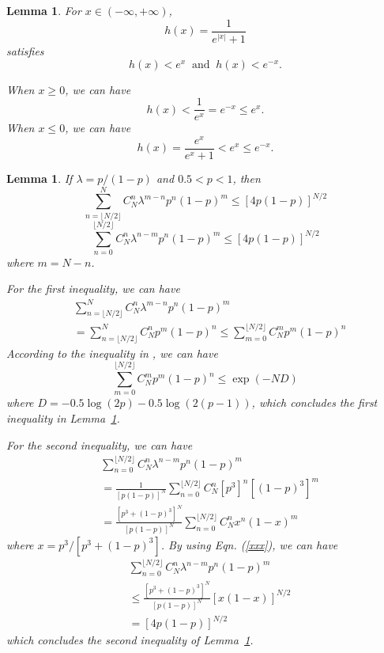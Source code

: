 \documentclass{article}
\makeatletter
\newcounter{lemmas}
\newtheorem{lemma}[lemmas]{Lemma}
\renewenvironment{proof}[1][\proofname]{\par
  \vspace{-\topsep}%
  \pushQED{\qed}%
  \normalfont
  \topsep0pt \partopsep0pt %
  \trivlist
  \item[\hskip\labelsep
        \itshape
    #1\@addpunct{.}]\ignorespaces
}{%
  \popQED\endtrivlist\@endpefalse
  \addvspace{0pt plus 0pt} %
}
\makeatother
\begin{document}
\begin{lemma}
\label{Concave2}
For $x\in(-\infty, +\infty)$, 
$$h(x)=\frac{1}{e^{|x|}+1}$$
satisfies
$$h(x)< e^x \;\;\mathrm{and}\;\; h(x)< e^{-x}.$$
\begin{proof}
When $x\geq 0$, we can have
\begin{equation}
h(x)<\frac{1}{e^x}=e^{-x}\leq e^{x}.
\end{equation}
When $x\leq 0$, we can have
\begin{equation}
h(x)=\frac{e^x}{e^x+1}<e^{x}\leq e^{-x}.
\end{equation}
\end{proof}
\end{lemma}

\begin{lemma}
\label{Concave3}
If $\lambda=p/(1-p)$ and $0.5<p<1$, then
$${\sum}_{n=\lfloor N/2 \rfloor}^{N}C_N^n\lambda^{m-n}p^n(1-p)^m\leq [4p(1-p)]^{N/2}$$
$${\sum}_{n=0}^{\lfloor N/2 \rfloor}C_N^n\lambda^{n-m}p^n(1-p)^m\leq [4p(1-p)]^{N/2}$$
where $m=N-n$.
\begin{proof}
For the first inequality, we can have
\begin{align}
&\sum_{n=\lfloor N/2 \rfloor}^{N}C_N^n\lambda^{m-n}p^n(1-p)^m \\&=\sum_{n=\lfloor N/2 \rfloor}^{N}C_N^np^m(1-p)^n\leq \sum_{m=0}^{\lfloor N/2 \rfloor}C_N^m p^m(1-p)^n\nonumber
\end{align}
According to the inequality in \cite{Arratia1989}, we can have
\begin{equation}
\label{xxx}
 \sum_{m=0}^{\lfloor N/2 \rfloor}C_N^m p^m(1-p)^n \leq \exp (-ND)
\end{equation}
where $D=-0.5\log(2p)-0.5\log(2(p-1))$, which concludes the first inequality in Lemma~\ref{Concave3}.

For the second inequality, we can have
\begin{equation}
\begin{split}
&\sum_{n=0}^{\lfloor N/2 \rfloor}C_N^n\lambda^{n-m}p^n(1-p)^m \\
&= \frac{1}{[p(1-p)]^N}\sum_{n=0}^{\lfloor N/2 \rfloor}C_N^n[p^3]^n[(1-p)^3]^m
 \\&=\frac{[p^3+(1-p)^3]^N}{[p(1-p)]^N}\sum_{n=0}^{\lfloor N/2 \rfloor}C_N^n x^n(1-x)^m
\end{split}
\end{equation}
where $x=p^3/[p^3+(1-p)^3]$. By using Eqn. (\ref{xxx}), we can have
\begin{equation}
\begin{split}
&\sum_{n=0}^{\lfloor N/2 \rfloor}C_N^n\lambda^{n-m}p^n(1-p)^m\\
&\leq \frac{[p^3+(1-p)^3]^N}{[p(1-p)]^N} [x(1-x)]^{N/2} \\
&=[4p(1-p)]^{N/2}
\end{split}
\end{equation}
which concludes the second inequality of Lemma~\ref{Concave3}.
\end{proof}
\end{lemma}
\end{document}
